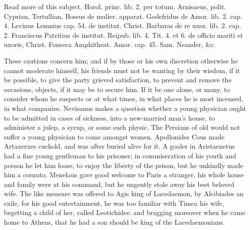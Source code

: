 {Read more of this subject, Horol. princ. lib. 2. per totum. Arnisaeus,
polit. Cyprian, Tertullian, Bossus de mulier. apparat. Godefridus de
Amor. lib. 2. cap. 4. Levinus Lemnius cap. 54. de institut. Christ.
Barbaras de re uxor. lib. 2. cap. 2. Franciscus Patritius de institut.
Reipub. lib. 4. Tit. 4. et 6. de officio mariti et uxoris, Christ.
Fonseca Amphitheat. Amor. cap. 45. Sam. Neander, \&c.

These cautions concern him; and if by those or his own discretion
otherwise he cannot moderate himself, his friends must not be wanting
by their wisdom, if it be possible, to give the party grieved
satisfaction, to prevent and remove the occasions, objects, if it may
be to secure him. If it be one alone, or many, to consider whom he
suspects or at what times, in what places he is most incensed, in what
companies. Nevisanus makes a question whether a young physician
ought to be admitted in cases of sickness, into a new-married man's
house, to administer a julep, a syrup, or some such physic. The
Persians of old would not suffer a young physician to come amongst
women. Apollonides Cous made Artaxerxes cuckold, and was after
buried alive for it. A goaler in Aristaenetus had a fine young
gentleman to his prisoner; in commiseration of his youth and
person he let him loose, to enjoy the liberty of the prison, but he
unkindly made him a cornuto. Menelaus gave good welcome to Paris a
stranger, his whole house and family were at his command, but he
ungently stole away his best beloved wife. The like measure was offered
to Agis king of Lacedaemon, by  Alcibiades an exile, for his good
entertainment, he was too familiar with Timea his wife, begetting a
child of her, called Leotichides: and bragging moreover when he came
home to Athens, that he had a son should be king of the Lacedaemonians.

}
